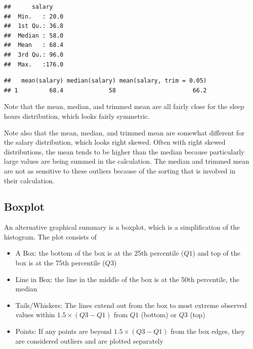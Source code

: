 \documentclass[]{book}
\newenvironment{Shaded}{\begin{snugshade}}{\end{snugshade}}
\newcommand{\DataTypeTok}[1]{\textcolor[rgb]{0.13,0.29,0.53}{#1}}
\newcommand{\FloatTok}[1]{\textcolor[rgb]{0.00,0.00,0.81}{#1}}
\newcommand{\KeywordTok}[1]{\textcolor[rgb]{0.13,0.29,0.53}{\textbf{#1}}}
\newcommand{\NormalTok}[1]{#1}
\newcommand{\OperatorTok}[1]{\textcolor[rgb]{0.81,0.36,0.00}{\textbf{#1}}}
\newcommand{\StringTok}[1]{\textcolor[rgb]{0.31,0.60,0.02}{#1}}
\providecommand{\tightlist}{%
  \setlength{\itemsep}{0pt}\setlength{\parskip}{0pt}}
\begin{document}
\begin{verbatim}
##      salary     
##  Min.   : 20.0  
##  1st Qu.: 36.8  
##  Median : 58.0  
##  Mean   : 68.4  
##  3rd Qu.: 96.0  
##  Max.   :176.0
\end{verbatim}

\begin{Shaded}
\end{Shaded}

\begin{verbatim}
##   mean(salary) median(salary) mean(salary, trim = 0.05)
## 1         68.4             58                      66.2
\end{verbatim}

Note that the mean, median, and trimmed mean are all fairly close for the sleep hours distribution, which looks fairly symmetric.

Note also that the mean, median, and trimmed mean are somewhat different for the salary distribution, which looks right skewed. Often with right skewed distributions, the mean tends to be higher than the median because particularly large values are being summed in the calculation. The median and trimmed mean are not as sensitive to these outliers because of the sorting that is involved in their calculation.

\hypertarget{boxplot}{%
\subsection{Boxplot}\label{boxplot}}

An alternative graphical summary is a boxplot, which is a simplification of the histogram. The plot consists of

\begin{itemize}
\tightlist
\item
  A Box: the bottom of the box is at the 25th percentile (\(Q1\)) and top of the box is at the 75th percentile (\(Q3\))
\item
  Line in Box: the line in the middle of the box is at the 50th percentile, the median
\item
  Tails/Whiskers: The lines extend out from the box to most extreme observed values within \(1.5 \times (Q3-Q1)\) from \(Q1\) (bottom) or \(Q3\) (top)
\item
  Points: If any points are beyond \(1.5 \times (Q3-Q1)\) from the box edges, they are considered outliers and are plotted separately
\end{itemize}
\end{document}
